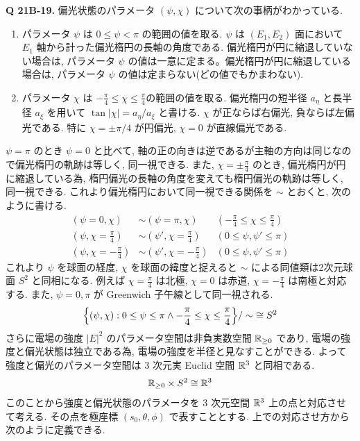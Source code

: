 \documentclass[a4paper,dvipdfmx]{jsarticle}
\theoremstyle{definition}
\begin{document}
\textbf{Q 21B-19.}
偏光状態のパラメータ $(\psi, \chi)$ について次の事柄がわかっている.
\begin{enumerate}
  \item パラメータ $\psi$ は $0\leq\psi<\pi$ の範囲の値を取る. $\psi$ は $(E_1, E_2)$ 面において $E_1$ 軸から計った偏光楕円の長軸の角度である. 偏光楕円が円に縮退していない場合は, パラメータ $\psi$ の値は一意に定まる。偏光楕円が円に縮退している場合は, パラメータ $\psi$ の値は定まらない(どの値でもかまわない).
  \item  パラメータ $\chi$ は $-\frac{\pi}{4}\leq\chi\leq\frac{\pi}{4}$の範囲の値を取る. 偏光楕円の短半径 $a_\eta$ と長半径 $a_\xi$ を用いて $\tan|\chi| = a_\eta/a_\xi$ と書ける. $\chi$ が正ならば右偏光, 負ならば左偏光である. 特に $\chi = \pm \pi/4$ が円偏光, $\chi = 0$ が直線偏光である.
\end{enumerate}
$\psi = \pi$ のとき $\psi = 0$ と比べて, 軸の正の向きは逆であるが主軸の方向は同じなので偏光楕円の軌跡は等しく, 同一視できる. また, $\chi = \pm\frac{\pi}{4}$ のとき, 偏光楕円が円に縮退している為, 楕円偏光の長軸の角度を変えても楕円偏光の軌跡は等しく, 同一視できる. これより偏光楕円において同一視できる関係を $\sim$ とおくと, 次のように書ける.
\begin{align}
  (\psi = 0, \chi)              & \sim (\psi = \pi, \chi)             & (-\frac{\pi}{4}\leq\chi\leq\frac{\pi}{4}) \\
  (\psi, \chi = \frac{\pi}{4})  & \sim (\psi', \chi = \frac{\pi}{4})  & (0\leq\psi,\psi'\leq\pi)                  \\
  (\psi, \chi = -\frac{\pi}{4}) & \sim (\psi', \chi = -\frac{\pi}{4}) & (0\leq\psi,\psi'\leq\pi)
\end{align}
これより $\psi$ を球面の経度, $\chi$ を球面の緯度と捉えると $\sim$ による同値類は2次元球面 $S^2$ と同相になる. 例えば $\chi = \frac{\pi}{4}$ は北極, $\chi = 0$ は赤道, $\chi = -\frac{\pi}{4}$ は南極と対応する. また, $\psi = 0,\pi$ が Greenwich 子午線として同一視される.
\begin{align}
  \qty{(\psi, \chi):0\leq\psi\leq\pi \land -\frac{\pi}{4}\leq\chi\leq\frac{\pi}{4}}/\sim\ \cong S^2
\end{align}
さらに電場の強度 $|E|^2$ のパラメータ空間は非負実数空間 $\mathbb{R}_{\geq0}$ であり, 電場の強度と偏光状態は独立である為, 電場の強度を半径と見なすことができる. よって強度と偏光のパラメータ空間は 3 次元実 Euclid 空間 $\mathbb{R}^3$ と同相である.
\begin{align}
  \mathbb{R}_{\geq 0}\times S^2 \cong \mathbb{R}^3
\end{align}
このことから強度と偏光状態のパラメータを 3 次元空間 $\mathbb{R}^3$ 上の点と対応させて考える. その点を極座標 $(s_0, \theta, \phi)$ で表すこととする. 上での対応させ方から次のように定義できる.
\end{document}
